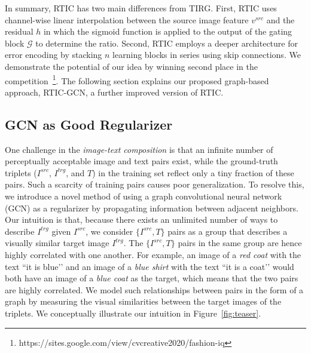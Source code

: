 \documentclass[10pt,twocolumn,letterpaper]{article}
\begin{document}
In summary, RTIC has two main differences from TIRG. First, RTIC uses channel-wise linear interpolation between the source image feature $v^{src}$ and the residual $h$ in which the sigmoid function is applied to the output of the gating block $\mathcal{G}$ to determine the ratio. Second, RTIC employs a deeper architecture for error encoding by stacking $n$ learning blocks in series using skip connections. We demonstrate the potential of our idea by winning second place in the competition~\footnote{https://sites.google.com/view/cvcreative2020/fashion-iq}. The following section explains our proposed graph-based approach, RTIC-GCN, a further improved version of RTIC.

\subsection{GCN as Good Regularizer}

One challenge in the \textit{image-text composition} is that an infinite number of perceptually acceptable image and text pairs exist, while the ground-truth triplets ($I^{src}$, $I^{trg}$, and $T$) in the training set reflect only a tiny fraction of these pairs. Such a scarcity of training pairs causes poor generalization. To resolve this, we introduce a novel method of using a graph convolutional neural network (GCN) as a regularizer by propagating information between adjacent neighbors. Our intuition is that, because there exists an unlimited number of ways to describe $I^{trg}$ given $I^{src}$, we consider $\{I^{src}, T\}$ pairs as a group that describes a visually similar target image $I^{trg}$. The $\{I^{src}, T\}$ pairs in the same group are hence highly correlated with one another. For example,  an image of a \textit{red coat} with the text ``it is blue’’ and an image of a \textit{blue shirt} with the text ``it is a coat’’ would both have an image of a \textit{blue coat} as the target, which means that the two pairs are highly correlated. We model such relationships between pairs in the form of a graph by measuring the visual similarities between the target images of the triplets. We conceptually illustrate our intuition in Figure~\ref{fig:teaser}.
\end{document}
